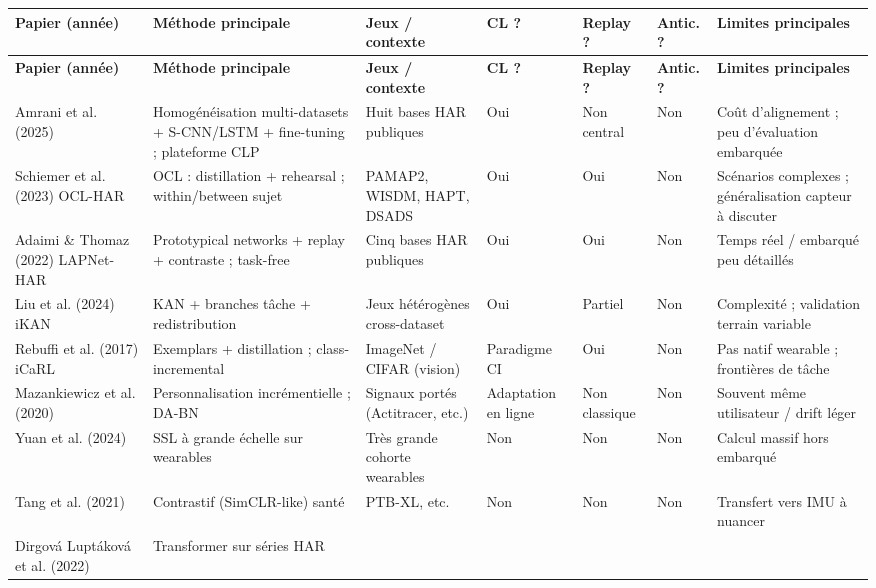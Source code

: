 \documentclass[a4paper,12pt]{report}
\begin{document}
{\small
\begin{longtable}{|>{\raggedright\arraybackslash}p{2.0cm}|>{\raggedright\arraybackslash}p{2.6cm}|>{\raggedright\arraybackslash}p{2.1cm}|>{\centering\arraybackslash}p{1.1cm}|>{\centering\arraybackslash}p{1.1cm}|>{\centering\arraybackslash}p{1.0cm}|>{\raggedright\arraybackslash}p{2.5cm}|}
\hline
\textbf{Papier (année)} & \textbf{Méthode principale} & \textbf{Jeux / contexte} & \textbf{CL ?} & \textbf{Replay ?} & \textbf{Antic. ?} & \textbf{Limites principales} \\
\hline
\endfirsthead
\hline
\textbf{Papier (année)} & \textbf{Méthode principale} & \textbf{Jeux / contexte} & \textbf{CL ?} & \textbf{Replay ?} & \textbf{Antic. ?} & \textbf{Limites principales} \\
\hline
\endhead
Amrani et al. (2025) &
Homogénéisation multi-datasets + S-CNN/LSTM + fine-tuning ; plateforme CLP &
Huit bases HAR publiques &
Oui &
Non central &
Non &
Coût d'alignement ; peu d'évaluation embarquée \\
\hline
Schiemer et al. (2023) OCL-HAR &
OCL : distillation + rehearsal ; within/between sujet &
PAMAP2, WISDM, HAPT, DSADS &
Oui &
Oui &
Non &
Scénarios complexes ; généralisation capteur à discuter \\
\hline
Adaimi \& Thomaz (2022) LAPNet-HAR &
Prototypical networks + replay + contraste ; task-free &
Cinq bases HAR publiques &
Oui &
Oui &
Non &
Temps réel / embarqué peu détaillés \\
\hline
Liu et al. (2024) iKAN &
KAN + branches tâche + redistribution &
Jeux hétérogènes cross-dataset &
Oui &
Partiel &
Non &
Complexité ; validation terrain variable \\
\hline
Rebuffi et al. (2017) iCaRL &
Exemplars + distillation ; class-incremental &
ImageNet / CIFAR (vision) &
Paradigme CI &
Oui &
Non &
Pas natif wearable ; frontières de tâche \\
\hline
Mazankiewicz et al. (2020) &
Personnalisation incrémentielle ; DA-BN &
Signaux portés (Actitracer, etc.) &
Adaptation en ligne &
Non classique &
Non &
Souvent même utilisateur / drift léger \\
\hline
Yuan et al. (2024) &
SSL à grande échelle sur wearables &
Très grande cohorte wearables &
Non &
Non &
Non &
Calcul massif hors embarqué \\
\hline
Tang et al. (2021) &
Contrastif (SimCLR-like) santé &
PTB-XL, etc. &
Non &
Non &
Non &
Transfert vers IMU à nuancer \\
\hline
Dirgová Luptáková et al. (2022) &
Transformer sur séries HAR &

\end{longtable}}
\end{document}
